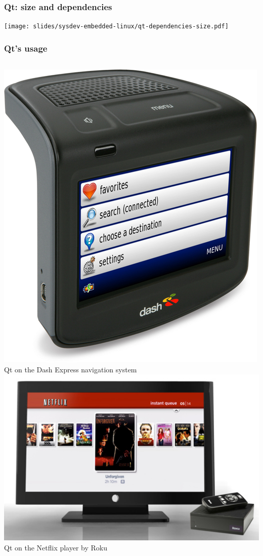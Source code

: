 \begin{frame}
  \frametitle{Qt: size and dependencies}
  \begin{center}
    \texttt{[image: slides/sysdev-embedded-linux/qt-dependencies-size.pdf]}
  \end{center}
\end{frame}

\begin{frame}
  \frametitle{Qt's usage}
  \begin{columns}
    \includegraphics[width=\textwidth]{slides/sysdev-embedded-linux/dash-express-gui.jpg}\\
    Qt on the Dash Express navigation system
    \includegraphics[width=\textwidth]{slides/sysdev-embedded-linux/roku-netflix-gui.jpg}\\
    Qt on the Netflix player by Roku
  \end{columns}
\end{frame}

